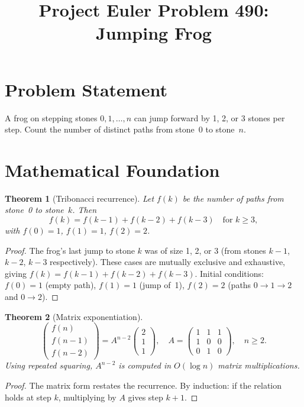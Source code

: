 \documentclass[12pt]{article}
\title{Project Euler Problem 490: Jumping Frog}
\author{}
\date{}
\newtheorem{theorem}{Theorem}
\begin{document}
\maketitle

\section{Problem Statement}
A frog on stepping stones $0,1,\ldots,n$ can jump forward by 1, 2, or 3 stones per step. Count the number of distinct paths from stone~0 to stone~$n$.

\section{Mathematical Foundation}

\begin{theorem}[Tribonacci recurrence]
Let $f(k)$ be the number of paths from stone~0 to stone~$k$. Then
\[
f(k) = f(k-1)+f(k-2)+f(k-3) \quad\text{for }k\ge 3,
\]
with $f(0)=1$, $f(1)=1$, $f(2)=2$.
\end{theorem}

\begin{proof}
The frog's last jump to stone $k$ was of size 1, 2, or 3 (from stones $k-1$, $k-2$, $k-3$ respectively). These cases are mutually exclusive and exhaustive, giving $f(k)=f(k-1)+f(k-2)+f(k-3)$. Initial conditions: $f(0)=1$ (empty path), $f(1)=1$ (jump of~1), $f(2)=2$ (paths $0\to1\to2$ and $0\to2$).
\end{proof}

\begin{theorem}[Matrix exponentiation]
\[
\begin{pmatrix}f(n)\\f(n-1)\\f(n-2)\end{pmatrix} = A^{n-2}\begin{pmatrix}2\\1\\1\end{pmatrix},\quad A=\begin{pmatrix}1&1&1\\1&0&0\\0&1&0\end{pmatrix},\quad n\ge 2.
\]
Using repeated squaring, $A^{n-2}$ is computed in $O(\log n)$ matrix multiplications.
\end{theorem}

\begin{proof}
The matrix form restates the recurrence. By induction: if the relation holds at step $k$, multiplying by $A$ gives step $k+1$.
\end{proof}
\end{document}
